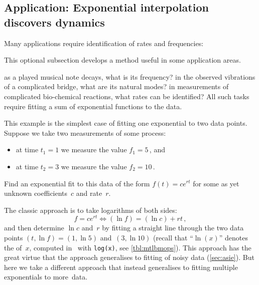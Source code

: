 









\begin{draft}%
\subsection{Application: Exponential interpolation discovers dynamics}
\label{sec:eidd}


Many applications require identification of rates and frequencies:
\begin{aside}
This optional subsection develops a method useful in some application areas.
\end{aside}%
as a played musical note decays, what is its frequency?
in the observed vibrations of a complicated bridge, what are its natural modes?
in measurements of complicated bio-chemical reactions, what rates can be identified?
All such tasks require fitting a sum of exponential functions to the data.


\begin{example} \label{eg:}
This example is the simplest case of fitting one exponential to two data points.
Suppose we take two measurements of some process: 
\begin{itemize}
\item at time \(t_1=1\) we measure the value \(f_1=5\)\,, and 
\item at time \(t_2=3\) we measure the value \(f_2=10\)\,.
\end{itemize}
Find an exponential fit to this data of the form \(f(t)=ce^{rt}\) for some as yet unknown coefficients~\(c\) and rate~\(r\).
\begin{solution} 
The classic approach is to take logarithms of both sides:
\begin{equation*}
f=ce^{rt} \iff (\ln f)=(\ln c)+rt\,,
\end{equation*}
and then determine \(\ln c\) and~\(r\) by fitting a straight line through the two data points \((t,\ln f)=(1,\ln5)\) and~\((3,\ln10)\)
(recall that ``\(\ln(x)\)'' denotes the  of~\(x\),  computed in \script\ with \verb|log(x)|, see \autoref{tbl:mtlbmops}).
This approach has the great virtue that the approach generalises to fitting of noisy data (\autoref{sec:asie}).
But here we take a different approach that instead generalises to fitting multiple exponentials to more~data.


\end{solution}
\end{example}
\end{draft}
